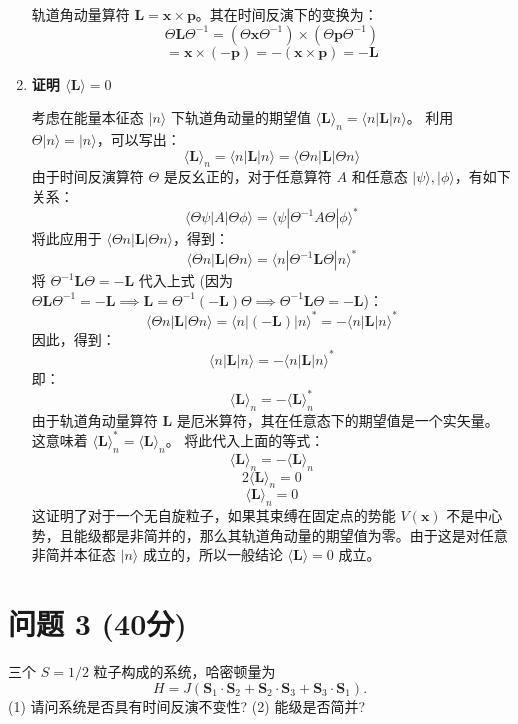 \documentclass{article}
\begin{document}
\begin{enumerate}
轨道角动量算符 \(\mathbf{L} = \mathbf{x} \times \mathbf{p}\)。其在时间反演下的变换为：
\[ \Theta \mathbf{L} \Theta^{-1} = (\Theta \mathbf{x} \Theta^{-1}) \times (\Theta \mathbf{p} \Theta^{-1}) \]
\[ = \mathbf{x} \times (-\mathbf{p}) = -(\mathbf{x} \times \mathbf{p}) = -\mathbf{L} \]

\item \textbf{证明 \(\langle \mathbf{L} \rangle = 0\)}

考虑在能量本征态 \(|n\rangle\) 下轨道角动量的期望值 \(\langle \mathbf{L} \rangle_n = \langle n | \mathbf{L} | n \rangle\)。
利用 \(\Theta |n\rangle = |n\rangle\)，可以写出：
\[ \langle \mathbf{L} \rangle_n = \langle n | \mathbf{L} | n \rangle = \langle \Theta n | \mathbf{L} | \Theta n \rangle \]
由于时间反演算符 \(\Theta\) 是反幺正的，对于任意算符 \(A\) 和任意态 \(|\psi\rangle, |\phi\rangle\)，有如下关系：
\[ \langle \Theta \psi | A | \Theta \phi \rangle = \langle \psi | \Theta^{-1} A \Theta | \phi \rangle^* \]
将此应用于 \(\langle \Theta n | \mathbf{L} | \Theta n \rangle\)，得到：
\[ \langle \Theta n | \mathbf{L} | \Theta n \rangle = \langle n | \Theta^{-1} \mathbf{L} \Theta | n \rangle^* \]
将 \(\Theta^{-1} \mathbf{L} \Theta = -\mathbf{L}\) 代入上式 (因为 \(\Theta \mathbf{L} \Theta^{-1} = -\mathbf{L} \implies \mathbf{L} = \Theta^{-1} (-\mathbf{L}) \Theta \implies \Theta^{-1} \mathbf{L} \Theta = -\mathbf{L}\))：
\[ \langle \Theta n | \mathbf{L} | \Theta n \rangle = \langle n | (-\mathbf{L}) | n \rangle^* = - \langle n | \mathbf{L} | n \rangle^* \]
因此，得到：
\[ \langle n | \mathbf{L} | n \rangle = - \langle n | \mathbf{L} | n \rangle^* \]
即：
\[ \langle \mathbf{L} \rangle_n = - \langle \mathbf{L} \rangle_n^* \]
由于轨道角动量算符 \(\mathbf{L}\) 是厄米算符，其在任意态下的期望值是一个实矢量。这意味着 \(\langle \mathbf{L} \rangle_n^* = \langle \mathbf{L} \rangle_n\)。
将此代入上面的等式：
\[ \langle \mathbf{L} \rangle_n = - \langle \mathbf{L} \rangle_n \]
\[ 2 \langle \mathbf{L} \rangle_n = 0 \]
\[ \langle \mathbf{L} \rangle_n = 0 \]
这证明了对于一个无自旋粒子，如果其束缚在固定点的势能 \(V(\mathbf{x})\) 不是中心势，且能级都是非简并的，那么其轨道角动量的期望值为零。由于这是对任意非简并本征态 \(|n\rangle\) 成立的，所以一般结论 \(\langle \mathbf{L} \rangle = 0\) 成立。
\end{enumerate}
\newpage
\section*{问题 3 (40分)}
\noindent 三个 \(S = 1/2\) 粒子构成的系统，哈密顿量为
\[ H = J(\mathbf{S}_1 \cdot \mathbf{S}_2 + \mathbf{S}_2 \cdot \mathbf{S}_3 + \mathbf{S}_3 \cdot \mathbf{S}_1). \]
\noindent (1) 请问系统是否具有时间反演不变性? (2) 能级是否简并?
\end{document}
